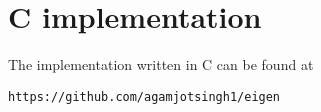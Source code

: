 \documentclass[12pt]{article}
\numberwithin{equation}{section}
\begin{document}
\section{C implementation}
The implementation written in C can be found at 
\begin{lstlisting}
https://github.com/agamjotsingh1/eigen
\end{lstlisting}
\end{document}

